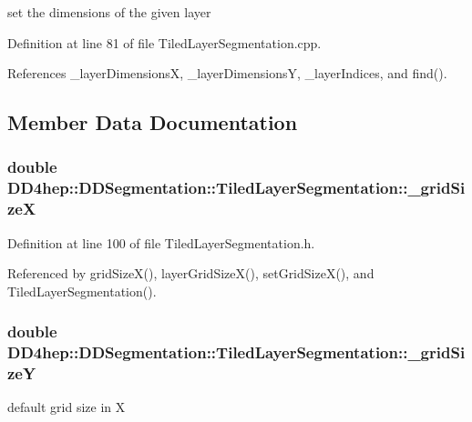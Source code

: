 set the dimensions of the given layer 

Definition at line 81 of file TiledLayerSegmentation.cpp.

References \_\-layerDimensionsX, \_\-layerDimensionsY, \_\-layerIndices, and find().

\subsection{Member Data Documentation}
\hypertarget{class_d_d4hep_1_1_d_d_segmentation_1_1_tiled_layer_segmentation_a8e60c82ed47b0b33c4c7918baea38296}{
\subsubsection[{\_\-gridSizeX}]{\setlength{\rightskip}{0pt plus 5cm}double {\bf DD4hep::DDSegmentation::TiledLayerSegmentation::\_\-gridSizeX}}}
\label{class_d_d4hep_1_1_d_d_segmentation_1_1_tiled_layer_segmentation_a8e60c82ed47b0b33c4c7918baea38296}


Definition at line 100 of file TiledLayerSegmentation.h.

Referenced by gridSizeX(), layerGridSizeX(), setGridSizeX(), and TiledLayerSegmentation().\hypertarget{class_d_d4hep_1_1_d_d_segmentation_1_1_tiled_layer_segmentation_a71e5e4524b30002b118f464626558c39}{
\subsubsection[{\_\-gridSizeY}]{\setlength{\rightskip}{0pt plus 5cm}double {\bf DD4hep::DDSegmentation::TiledLayerSegmentation::\_\-gridSizeY}}}
\label{class_d_d4hep_1_1_d_d_segmentation_1_1_tiled_layer_segmentation_a71e5e4524b30002b118f464626558c39}


default grid size in X 

